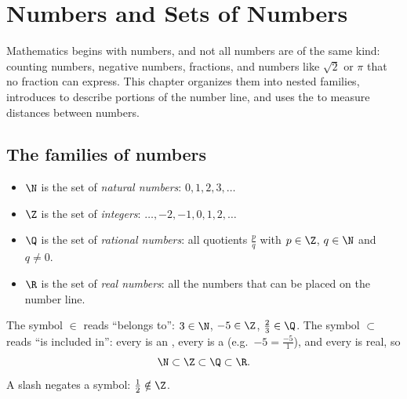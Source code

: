 \chapter{Numbers and Sets of Numbers}\label{ch:g10:numbers}

Mathematics begins with numbers, and not all numbers are of the same kind:
counting numbers, negative numbers, fractions, and numbers like $\sqrt 2$
or $\pi$ that no fraction can express. This chapter organizes them into
nested families, introduces  to describe portions of the number
line, and uses the  to measure distances between numbers.

\section{The families of numbers}

\begin{definition}\label{def:g10:numbers:sets}
\begin{itemize}
  \item $\N$ is the set of \emph{natural numbers}:
        $0, 1, 2, 3, \dots$
  \item $\Z$ is the set of \emph{integers}: $\dots, -2, -1,
        0, 1, 2, \dots$
  \item $\Q$ is the set of \emph{rational numbers}:
        all quotients $\frac{p}{q}$ with $p \in \Z$, $q \in \N$ and
        $q \neq 0$.
  \item $\R$ is the set of \emph{real numbers}: all the
        numbers that can be placed on the number line.
\end{itemize}
\end{definition}

\begin{notation}
The symbol $\in$ reads ``belongs to'': $3 \in \N$, $-5 \in \Z$,
$\frac23 \in \Q$. The symbol $\subset$ reads ``is included in'': every
 is an , every  is a 
(e.g.\ $-5 = \frac{-5}{1}$), and every  is real, so
\[
\N \subset \Z \subset \Q \subset \R .
\]
A slash negates a symbol: $\frac12 \notin \Z$.
\end{notation}


